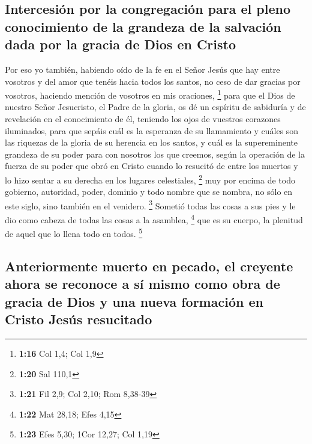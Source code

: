 \hypertarget{intercesiuxf3n-por-la-congregaciuxf3n-para-el-pleno-conocimiento-de-la-grandeza-de-la-salvaciuxf3n-dada-por-la-gracia-de-dios-en-cristo}{%
\subsection{Intercesión por la congregación para el pleno conocimiento
de la grandeza de la salvación dada por la gracia de Dios en
Cristo}\label{intercesiuxf3n-por-la-congregaciuxf3n-para-el-pleno-conocimiento-de-la-grandeza-de-la-salvaciuxf3n-dada-por-la-gracia-de-dios-en-cristo}}

 Por eso yo también, habiendo oído de la fe en el Señor
Jesús que hay entre vosotros y del amor que tenéis hacia todos los
santos,  no ceso de dar gracias por vosotros, haciendo
mención de vosotros en mis oraciones, \footnote{\textbf{1:16} Col 1,4;
  Col 1,9}  para que el Dios de nuestro Señor Jesucristo,
el Padre de la gloria, os dé un espíritu de sabiduría y de revelación en
el conocimiento de él,  teniendo los ojos de vuestros
corazones iluminados, para que sepáis cuál es la esperanza de su
llamamiento y cuáles son las riquezas de la gloria de su herencia en los
santos,  y cuál es la supereminente grandeza de su poder
para con nosotros los que creemos, según la operación de la fuerza de su
poder  que obró en Cristo cuando lo resucitó de entre los
muertos y lo hizo sentar a su derecha en los lugares celestiales,
\footnote{\textbf{1:20} Sal 110,1}  muy por encima de
todo gobierno, autoridad, poder, dominio y todo nombre que se nombra, no
sólo en este siglo, sino también en el venidero. \footnote{\textbf{1:21}
  Fil 2,9; Col 2,10; Rom 8,38-39}  Sometió todas las
cosas a sus pies y le dio como cabeza de todas las cosas a la asamblea,
\footnote{\textbf{1:22} Mat 28,18; Efes 4,15}  que es su
cuerpo, la plenitud de aquel que lo llena todo en todos. \footnote{\textbf{1:23}
  Efes 5,30; 1Cor 12,27; Col 1,19}

\hypertarget{anteriormente-muerto-en-pecado-el-creyente-ahora-se-reconoce-a-suxed-mismo-como-obra-de-gracia-de-dios-y-una-nueva-formaciuxf3n-en-cristo-jesuxfas-resucitado}{%
\subsection{Anteriormente muerto en pecado, el creyente ahora se
reconoce a sí mismo como obra de gracia de Dios y una nueva formación en
Cristo Jesús
resucitado}\label{anteriormente-muerto-en-pecado-el-creyente-ahora-se-reconoce-a-suxed-mismo-como-obra-de-gracia-de-dios-y-una-nueva-formaciuxf3n-en-cristo-jesuxfas-resucitado}}

